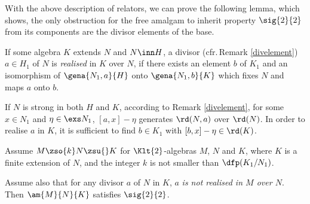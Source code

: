 With the above description of relators, we can prove the following lemma, which
shows, the only obstruction for the free amalgam to inherit property $\sig{2}{2}$ from
its components are the divisor elements of the base.

\smallskip
If some algebra $K$ extends $N$ and $N\inn H$, a divisor (cfr.\,Remark \ref{divelement}) $a\in H_{1}$ of $N$ is {\em realised} %
in $K$ over $N$, if there exists an element $b$ of $K_{1}$ and an isomorphism
of $\gena{N_{1},a}{H}$ onto $\gena{N_{1},b}{K}$ which fixes $N$ and maps $a$ onto $b$.

If $N$ is strong in both $H$ and $K$, according to Remark \ref{divelement},
for some $x\in N_{1}$ and $\eta\in\exs N_{1}$, $[a,x]-\eta$ generates $\rd(N,a)$ over $\rd(N)$.
In order to realise $a$ in $K$, it is sufficient to find $b\in K_{1}$ with $[b,x]-\eta\in\rd(K)$.
\begin{prop}\label{amalsigma2}
Assume $M\zso{k}N\zsu{}K$ for $\Klt{2}$-algebras $M$, $N$ and $K$, %
where $K$ is a finite extension of $N$,
and the integer $k$ is not smaller than $\dfp(K_{1}/N_{1})$.

Assume also that for any divisor $a$ of $N$ in $K$, $a$ {\em is not realised in $M$ over $N$}.
Then $\am{M}{N}{K}$ satisfies $\sig{2}{2}$.
\end{prop}
